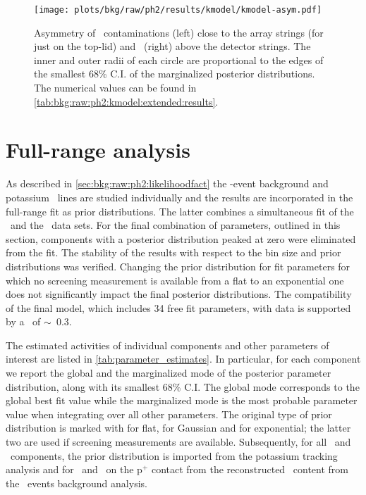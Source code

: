 \begin{figure}
  \centering
  \texttt{[image: plots/bkg/raw/ph2/results/kmodel/kmodel-asym.pdf]}
  \caption{%
    Asymmetry of \kvn\ contaminations (left) close to the array strings (for  just
    on the top-lid) and \kvz\ (right) above the detector strings. The inner and outer
    radii of each circle are proportional to the edges of the smallest 68\% C.I. of the
    marginalized posterior distributions. The numerical values can be found in
    \cref{tab:bkg:raw:ph2:kmodel:extended:results}. 
  }\label{fig:bkg:raw:ph2:kmodel:extended:strings}
\end{figure}

\section{Full-range analysis}%
\label{sec:bkg:raw:ph2:gmodel}

As described in \cref{sec:bkg:raw:ph2:likelihoodfact} the \a-event
background and potassium \g\ lines are studied individually and the
results are incorporated in the full-range fit as prior distributions.
The latter combines a simultaneous fit of the \Mone\ and the
\Mtwo\ data sets. For the final combination of parameters, outlined
in this section, components with a posterior distribution peaked at zero
were eliminated from the fit. The stability of the results with respect
to the bin size and prior distributions was verified. Changing the prior
distribution for fit parameters for which no screening measurement is
available from a flat to an exponential one does not significantly
impact the final posterior distributions. The compatibility of the final
model, which includes 34 free fit parameters, with data is supported by
a \pvalue\ of $\sim$~0.3.

The estimated activities of individual components and other parameters
of interest are listed in \cref{tab:parameter_estimates}. In
particular, for each component we report the global and the marginalized
mode of the posterior parameter distribution, along with its smallest
68\% C.I. The global mode corresponds to the global best fit value
while the marginalized mode is the most probable parameter value when
integrating over all other parameters. The original type of prior
distribution is marked with \m{[f]} for flat, \m{[g]} for Gaussian and
\m{[e]} for exponential; the latter two are used if screening
measurements are available. Subsequently, for all \kvn\ and \kvz\
components, the prior distribution is imported from the potassium
tracking analysis and for \Pbh{}nd \Bih\ on the p$^+$ contact from the
reconstructed \Ra\ content from the \a\ events background analysis.

